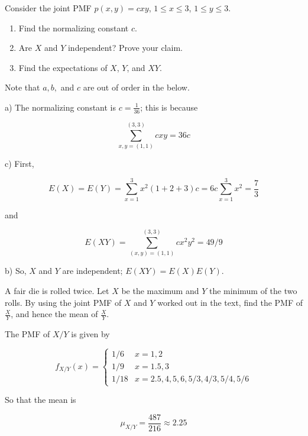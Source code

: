 \begin{problem}[Handout 15, \# 11]
  Consider the joint PMF \(p(x,y)=cxy\), \(1\leq x\leq 3\), \(1\leq y\leq
  3\).
  \begin{enumerate}[label=(\alph*),noitemsep]
  \item Find the normalizing constant \(c\).
  \item Are \(X\) and \(Y\) independent? Prove your claim.
  \item Find the expectations of \(X\), \(Y\), and \(XY\).
  \end{enumerate}
\end{problem}
\begin{solution}

Note that $a,b,$ and $c$ are out of order in the below.

a) The normalizing constant is $c=\frac{1}{36}$; this is because

\[
\sum\limits_{x,y =(1,1)}^{(3,3)} cxy = 36c
\]

c) First,

\[
E(X) = E(Y) = \sum\limits_{x=1}^3 x^2(1+2+3)c = 6c \sum\limits_{x=1}^3 x^2 = \frac{7}{3}  
\]

and

\[
E(XY) = \sum\limits_{(x,y) = (1,1)}^{(3,3)} cx^2y^2 = 49/9
\]

b) So, $X$ and $Y$ are independent; $E(XY) = E(X)E(Y)$.
\end{solution}
\newpage

\begin{problem}[Handout 15, \# 12]
  A fair die is rolled twice. Let \(X\) be the maximum and \(Y\) the
  minimum of the two rolls. By using the joint PMF of \(X\) and \(Y\)
  worked out in the text, find the PMF of \(\frac{X}{Y}\), and hence the
  mean of \(\frac{X}{Y}\).
\end{problem}
\begin{solution}
The PMF of $X/Y$ is given by 

\[   f_{X/Y}(x) = \left\{
\begin{array}{ll}
      1/6 & x=1,2 \\
      1/9 & x=1.5,3 \\
      1/18 & x = 2.5,4,5,6,5/3,4/3,5/4,5/6
\end{array} 
\right. \]

So that the mean is

\[
\mu_{X/Y} = \frac{487}{216} \approx 2.25
\]
\end{solution}
\newpage

